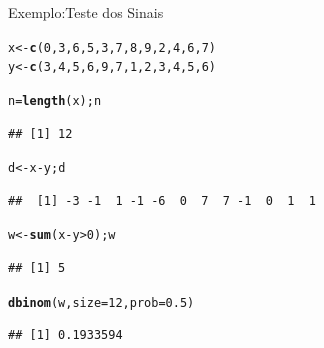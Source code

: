 \documentclass{beamer}\usepackage[]{graphicx}\usepackage[]{color}
\makeatletter
\newcommand{\hlnum}[1]{\textcolor[rgb]{0.686,0.059,0.569}{#1}}%
\newcommand{\hlopt}[1]{\textcolor[rgb]{0,0,0}{#1}}%
\newcommand{\hlstd}[1]{\textcolor[rgb]{0.345,0.345,0.345}{#1}}%
\newcommand{\hlkwb}[1]{\textcolor[rgb]{0.69,0.353,0.396}{#1}}%
\newcommand{\hlkwc}[1]{\textcolor[rgb]{0.333,0.667,0.333}{#1}}%
\newcommand{\hlkwd}[1]{\textcolor[rgb]{0.737,0.353,0.396}{\textbf{#1}}}%
\newenvironment{kframe}{%
 \def\at@end@of@kframe{}%
 \ifinner\ifhmode%
  \def\at@end@of@kframe{\end{minipage}}%
  \begin{minipage}{\columnwidth}%
 \fi\fi%
 \def\FrameCommand##1{\hskip\@totalleftmargin \hskip-\fboxsep
 \colorbox{shadecolor}{##1}\hskip-\fboxsep
     \hskip-\linewidth \hskip-\@totalleftmargin \hskip\columnwidth}%
 \MakeFramed {\advance\hsize-\width
   \@totalleftmargin\z@ \linewidth\hsize
   \@setminipage}}%
 {\par\unskip\endMakeFramed%
 \at@end@of@kframe}
\newenvironment{knitrout}{}{} %
\renewenvironment{knitrout}{\setlength{\topsep}{0mm}}{}
\makeatother
\begin{document}
\begin{frame}[fragile]{Exemplo:Teste dos Sinais}


\begin{knitrout}\tiny
{}\color{fgcolor}\begin{kframe}
\begin{alltt}
\hlstd{x} \hlkwb{<-} \hlkwd{c}\hlstd{(}\hlnum{0}\hlstd{,}\hlnum{3}\hlstd{,}\hlnum{6}\hlstd{,}\hlnum{5}\hlstd{,}\hlnum{3}\hlstd{,}\hlnum{7}\hlstd{,}\hlnum{8}\hlstd{,}\hlnum{9}\hlstd{,}\hlnum{2}\hlstd{,}\hlnum{4}\hlstd{,}\hlnum{6}\hlstd{,}\hlnum{7}\hlstd{)}
\hlstd{y} \hlkwb{<-} \hlkwd{c}\hlstd{(}\hlnum{3}\hlstd{,}\hlnum{4}\hlstd{,}\hlnum{5}\hlstd{,}\hlnum{6}\hlstd{,}\hlnum{9}\hlstd{,}\hlnum{7}\hlstd{,}\hlnum{1}\hlstd{,}\hlnum{2}\hlstd{,}\hlnum{3}\hlstd{,}\hlnum{4}\hlstd{,}\hlnum{5}\hlstd{,}\hlnum{6}\hlstd{)}

\hlstd{n}\hlkwb{=}\hlkwd{length}\hlstd{(x); n}
\end{alltt}
\begin{verbatim}
## [1] 12
\end{verbatim}
\begin{alltt}
\hlstd{d} \hlkwb{<-} \hlstd{x}\hlopt{-}\hlstd{y; d}
\end{alltt}
\begin{verbatim}
##  [1] -3 -1  1 -1 -6  0  7  7 -1  0  1  1
\end{verbatim}
\begin{alltt}
\hlstd{w} \hlkwb{<-} \hlkwd{sum}\hlstd{(x}\hlopt{-}\hlstd{y} \hlopt{>} \hlnum{0}\hlstd{); w}
\end{alltt}
\begin{verbatim}
## [1] 5
\end{verbatim}
\begin{alltt}
\hlkwd{dbinom}\hlstd{(w,}\hlkwc{size}\hlstd{=}\hlnum{12}\hlstd{,}\hlkwc{prob}\hlstd{=}\hlnum{0.5}\hlstd{)}
\end{alltt}
\begin{verbatim}
## [1] 0.1933594
\end{verbatim}
\end{kframe}
\end{knitrout}

\end{frame} 
\end{document}
